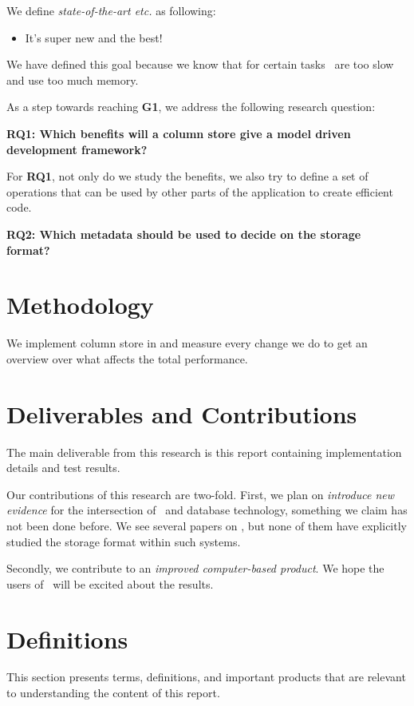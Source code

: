 We define \textit{state-of-the-art etc.} as following:
\begin{itemize}
    \item It's super new and the best!
\end{itemize}

We have defined this goal because we know that for certain tasks \genusSoftware~are too slow and use too much memory.

As a step towards reaching \textbf{G1}, we address the following research question:

\textbf{RQ1: Which benefits will a column store give a model driven development framework?} 

For \textbf{RQ1}, not only do we study the benefits, we also try to define a set of operations that can be used by other parts of the application to create efficient code.

\textbf{RQ2: Which metadata should be used to decide on the storage format?} 

\section{Methodology}
\label{sec:Methodology}
We implement column store in \genusSoftware and measure every change we do to get an overview over what affects the total performance.

\section{Deliverables and Contributions}
\label{sec:Deliverables and Contributions}
The main deliverable from this research is this report containing implementation details and test results.

Our contributions of this research are two-fold. First, we plan on \textit{introduce new evidence} for the intersection of \mdd~and database technology, something we claim has not been done before. We see several papers on \mdd, but none of them have explicitly studied the storage format within such systems.

Secondly, we contribute to an \textit{improved computer-based product}. We hope the users of \genusSoftware~will be excited about the results.

\section{Definitions}
\label{sec:Definitions}
This section presents terms, definitions, and important products that are relevant to understanding the content of this report.

